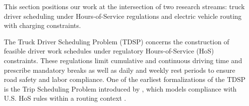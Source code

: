 \documentclass[3p,11pt,authoryear]{elsarticle}  %
\begin{document}

This section positions our work at the intersection of two research streams: truck driver scheduling under Hours-of-Service regulations and electric vehicle routing with charging constraints.

The Truck Driver Scheduling Problem (TDSP) concerns the construction of feasible driver work schedules under regulatory Hours-of-Service (HoS) constraints. These regulations limit cumulative and continuous driving time and prescribe mandatory breaks as well as daily and weekly rest periods to ensure road safety and labor compliance. One of the earliest formalizations of the TDSP is the Trip Scheduling Problem introduced by \citet{archetti2009trip}, which models compliance with U.S. HoS rules within a routing context \citep{goel2012minimum, goel2012truck}.
\end{document}
